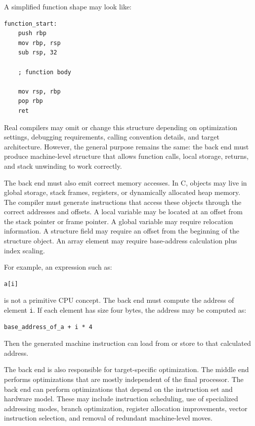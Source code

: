 A simplified function shape may look like:

\begin{verbatim}
function_start:
    push rbp
    mov rbp, rsp
    sub rsp, 32

    ; function body

    mov rsp, rbp
    pop rbp
    ret
\end{verbatim}

Real compilers may omit or change this structure depending on optimization settings, debugging requirements, calling convention details, and target architecture. However, the general purpose remains the same: the back end must produce machine-level structure that allows function calls, local storage, returns, and stack unwinding to work correctly.

The back end must also emit correct memory accesses. In C, objects may live in global storage, stack frames, registers, or dynamically allocated heap memory. The compiler must generate instructions that access these objects through the correct addresses and offsets. A local variable may be located at an offset from the stack pointer or frame pointer. A global variable may require relocation information. A structure field may require an offset from the beginning of the structure object. An array element may require base-address calculation plus index scaling.

For example, an expression such as:

\begin{verbatim}
a[i]
\end{verbatim}

is not a primitive CPU concept. The back end must compute the address of element \texttt{i}. If each element has size four bytes, the address may be computed as:

\begin{verbatim}
base_address_of_a + i * 4
\end{verbatim}

Then the generated machine instruction can load from or store to that calculated address.

The back end is also responsible for target-specific optimization. The middle end performs optimizations that are mostly independent of the final processor. The back end can perform optimizations that depend on the instruction set and hardware model. These may include instruction scheduling, use of specialized addressing modes, branch optimization, register allocation improvements, vector instruction selection, and removal of redundant machine-level moves.


